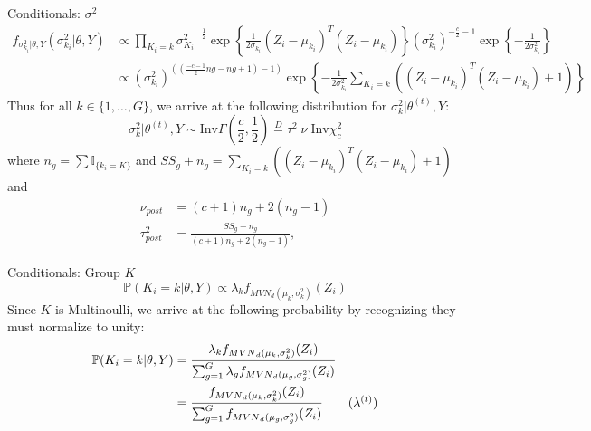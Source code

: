 \documentclass[handout]{beamer}
\begin{document}
\scriptsize
\begin{frame}{Conditionals: $\sigma^2$}
\begin{align*}
f_{\sigma_{k_i}^2|\theta, Y}(\sigma_{k_i}^2|\theta, Y) &\propto \prod_{K_i = k} 
{\sigma_{K_i}^2}^{-\frac{1}{2}} 
\exp \left\{ \frac{1}{2 \sigma_{k_i}}(Z_i-\mu_{k_i})^T(Z_i-\mu_{k_i})\right\} 
(\sigma_{k_i}^2)^{-\frac{c}{2} -1}  
 \exp \left\{-\frac{1}{2 \sigma_{k_i}^2}\right\} \\
 & \propto (\sigma_{k_i} ^2 )^{\left( (\frac{-c-1}{2} ng - ng +1 ) -1\right)}  
 \exp\left\{-\frac{1}{2 \sigma_{k_i}^2} \sum_{K_i = k} \left((Z_i-\mu_{k_i})^T(Z_i-\mu_{k_i})+1\right)\right\}
\end{align*}
Thus for all $k \in \{1, \ldots, G\}$, we arrive at the following distribution for $\sigma_k^2 | \theta^{(t)}, Y$:
\[\sigma_k^2 | \theta^{(t)}, Y \sim \text{Inv} \Gamma ( \frac{c}{2}, \frac{1}{2})  \overset{D}= \tau^2  \;\nu \; \text{Inv} \chi^2_c\]
where $n_g = \sum \mathbb{I} _{\{ k_i = K\}}$ and $SS_g + n_g = \sum_{K_i = k} \left((Z_i-\mu_{k_i})^T(Z_i-\mu_{k_i})+1\right) $ and
\begin{align*}
\nu_{post} &= (c + 1) n_g + 2( n_g - 1 )   \\
\tau^2_{post} &= \frac{SS_g + n_g} {(c + 1) n_g + 2 ( n_g -1)},
\end{align*} 
\end{frame}

\small
\begin{frame}{Conditionals: Group $K$}
\[\mathbb{P}(K_i = k | \theta, Y) \propto \lambda_k f_{{MVN}_d(\mu_k, \sigma_k^2)}(Z_i)\]
Since $K$ is Multinoulli, we arrive at the following probability by recognizing they must normalize to unity:
\begin{align*}
\mathbb{P}(K_i = k | \theta, Y) &= \frac{\lambda_k f_{{MVN}_d(\mu_k, \sigma_k^2)}(Z_i)}{\sum_{g=1}^G\lambda_g f_{{MVN}_d(\mu_g, \sigma_g^2)}(Z_i)} \\
&= \frac{f_{{MVN}_d(\mu_k, \sigma_k^2)}(Z_i)}{\sum_{g=1}^G f_{{MVN}_d(\mu_g, \sigma_g^2)}(Z_i)} \tag{$\lambda^{(t)}$}
\end{align*}
\end{frame}
\end{document}
